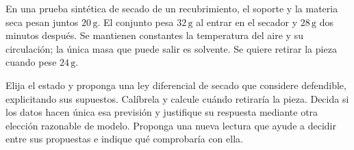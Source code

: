En una prueba sintética de secado de un recubrimiento, el soporte y la materia seca pesan juntos \(20\,\mathrm g\). El conjunto pesa \(32\,\mathrm g\) al entrar en el secador y \(28\,\mathrm g\) dos minutos después. Se mantienen constantes la temperatura del aire y su circulación; la única masa que puede salir es solvente. Se quiere retirar la pieza cuando pese \(24\,\mathrm g\).

Elija el estado y proponga una ley diferencial de secado que considere defendible, explicitando sus supuestos. Calíbrela y calcule cuándo retiraría la pieza. Decida si los datos hacen única esa previsión y justifique su respuesta mediante otra elección razonable de modelo. Proponga una nueva lectura que ayude a decidir entre sus propuestas e indique qué comprobaría con ella.
